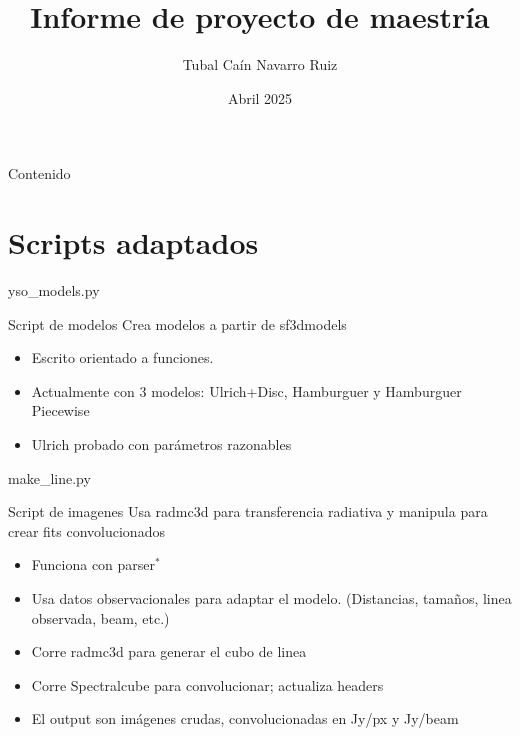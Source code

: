\documentclass{beamer}
\title{Informe de proyecto de maestría}
\author{Tubal Caín Navarro Ruiz}
\institute{IRyA - UNAM}
\date{Abril 2025}
\begin{document}
\begin{frame}
    \titlepage
\end{frame}


\begin{frame}{Contenido}
    \tableofcontents
\end{frame}


\section{Scripts adaptados}

\begin{frame}{yso\_models.py}
    \begin{block}{Script de modelos}
        Crea modelos a partir de sf3dmodels
    \end{block}

    \begin{itemize}
        \item Escrito orientado a funciones. 
        \item Actualmente con 3 modelos: Ulrich+Disc, Hamburguer y Hamburguer Piecewise
        \item Ulrich probado con parámetros razonables 
    \end{itemize}
    
\end{frame}

\begin{frame}{make\_line.py}
    \begin{block}{Script de imagenes}
        Usa radmc3d para transferencia radiativa y manipula para crear fits convolucionados
    \end{block}
    \begin{itemize}
        \item Funciona con parser$^*$
        \item Usa datos observacionales para adaptar el modelo. (Distancias, tamaños, linea observada, beam, etc.)
        \item Corre radmc3d para generar el cubo de linea
        \item Corre Spectralcube para convolucionar; actualiza headers
        \item El output son imágenes crudas, convolucionadas en Jy/px y Jy/beam
    \end{itemize}
\end{frame}
\end{document}
